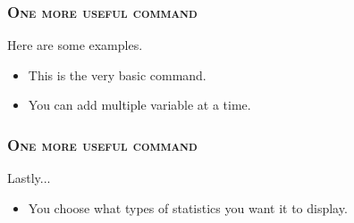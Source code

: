 \documentclass[10pt]{beamer}
\begin{document}
	\begin{frame}
	\frametitle{\textsc{One more useful command}}
		Here are some examples.
		\begin{itemize}
			\item This is the very basic command.
\begin{stlog}\end{stlog}
			\vspace{2mm}
			\item You can add multiple variable at a time.
\begin{stlog}\end{stlog}
		\end{itemize}
	\end{frame}
		
	\begin{frame}
	\frametitle{\textsc{One more useful command}}
	Lastly...
		\begin{itemize}
			\vspace{2mm}
			\item You choose what types of statistics you want it to display.
\begin{stlog}\end{stlog}
		\end{itemize}
	\end{frame}
	
	
\end{document}
